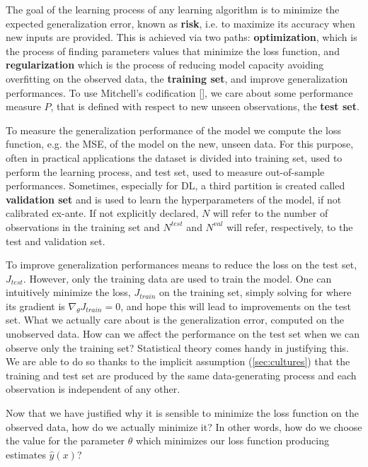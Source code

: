 The goal of the learning process of any learning algorithm is to minimize the expected generalization error, known as \textbf{risk}, i.e. to maximize its accuracy when new inputs are provided. This is achieved via two paths: \textbf{optimization}, which is the process of finding parameters values that minimize the loss function, and \textbf{regularization} which is the process of reducing model capacity avoiding overfitting on the observed data, the \textbf{training set}, and improve generalization performances. To use Mitchell's codification [\cite{Mitchell1997}], we care about some performance measure $P$, that is defined with respect to new unseen observations, the \textbf{test set}.

To measure the generalization performance of the model we compute the loss function, e.g. the MSE, of the model on the new, unseen data. For this purpose, often in practical applications the dataset is divided into training set, used to perform the learning process, and test set, used to measure out-of-sample performances. Sometimes, especially for DL, a third partition is created called \textbf{validation set} and is used to learn the hyperparameters of the model, if not calibrated ex-ante. If not explicitly declared, $N$ will refer to the number of observations in the training set and $N^{test}$ and $N^{val}$ will refer, respectively, to the test and validation set.

To improve generalization performances means to reduce the loss on the test set, $J_{test}$. However, only the training data are used to train the model. One can intuitively minimize the loss, $J_{train}$ on the training set, simply solving for where its gradient is $\nabla_{\theta}J_{train} = 0$, and hope this will lead to improvements on the test set. What we actually care about is the generalization error, computed on the unobserved data. How can we affect the performance on the test set when we can observe only the training set? Statistical theory comes handy in justifying this. We are able to do so thanks to the implicit assumption (\cref{sec:cultures}) that the training and test set are produced by the same data-generating process and each observation is independent of any other. 

Now that we have justified why it is sensible to minimize the loss function on the observed data, how do we actually minimize it? In other words, how do we choose the value for the parameter $\theta$ which minimizes our loss function producing  estimates $\hat{y}(x)$? 

